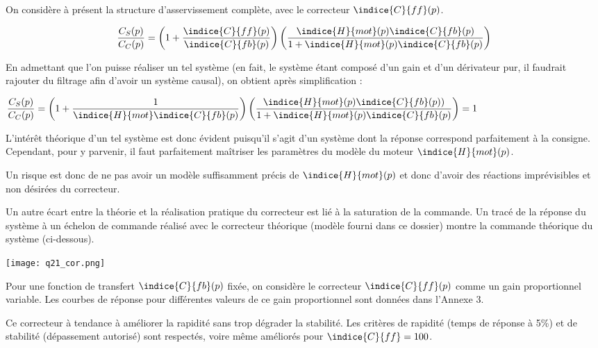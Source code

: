 On considère à présent la structure d'asservissement complète, avec le correcteur $\indice{C}{ff} (p)$.

\ifprof
\begin{corrige}
$$
\dfrac{C_S (p)}{C_C (p)}= \left(1+\dfrac{\indice{C}{ff} (p)}{\indice{C}{fb} (p)}\right) \left(\dfrac{\indice{H}{mot}(p) \indice{C}{fb} (p)}{1+\indice{H}{mot} (p)\indice{C}{fb} (p) }\right)
$$
\end{corrige}
\else
\fi

\ifprof
\begin{corrige}
En admettant que l’on puisse réaliser un tel système (en fait, le système étant composé d’un gain et d’un dérivateur pur, il faudrait rajouter du filtrage afin d’avoir un système causal), on obtient après simplification :
 
$\dfrac{C_S (p)}{C_C (p)}=\left(1+\dfrac{1}{\indice{H}{mot}\indice{C}{fb} (p)}\right)\left(\dfrac{\indice{H}{mot} (p)\indice{C}{fb} (p))}{1+\indice{H}{mot} (p)\indice{C}{fb} (p)}\right)=1$

L’intérêt théorique d’un tel système est donc évident puisqu’il s’agit d’un système dont la réponse correspond parfaitement à la consigne.
Cependant, pour y parvenir, il faut parfaitement maîtriser les paramètres du modèle du moteur $\indice{H}{mot} (p)$.

Un risque est donc de ne pas avoir un modèle suffisamment précis de $\indice{H}{mot} (p)$ et donc d’avoir des réactions imprévisibles et non désirées du correcteur.

Un autre  écart entre la théorie et la réalisation pratique du correcteur  est lié à la saturation de la commande. Un tracé de la réponse du système à un échelon de commande réalisé avec le correcteur théorique (modèle fourni dans ce dossier) montre la commande théorique du système (ci-dessous).

\begin{center}
\texttt{[image: q21\_cor.png]}
\end{center}



\end{corrige}
\else
\fi

Pour une fonction de transfert $\indice{C}{fb} (p)$ fixée, on considère le correcteur $\indice{C}{ff}(p)$ comme un gain
proportionnel variable. Les courbes de réponse pour différentes valeurs de ce gain proportionnel
sont données dans l'Annexe 3.

\ifprof
\begin{corrige}
 Ce correcteur à tendance à améliorer la rapidité sans trop dégrader la stabilité. Les critères de rapidité (temps de réponse à 5\%) et de stabilité (dépassement autorisé) sont respectés, voire même améliorés pour $\indice{C}{ff}  = 100$.
\end{corrige}
\else
\fi
